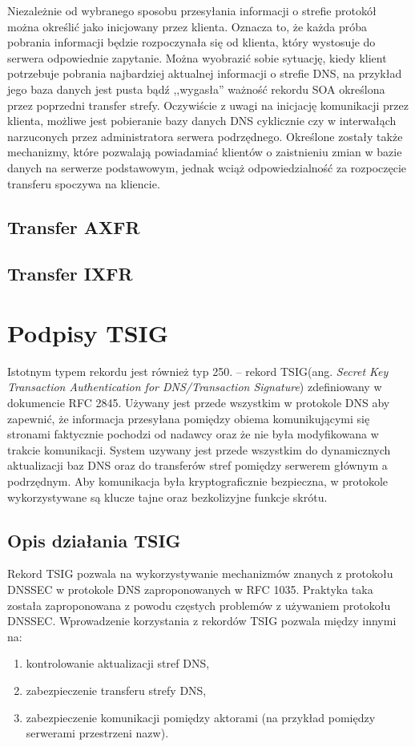 Niezależnie od wybranego sposobu przesyłania informacji o strefie protokół można określić jako inicjowany przez klienta. Oznacza to, że każda próba pobrania informacji będzie rozpoczynała się od klienta, który wystosuje do serwera odpowiednie zapytanie. Można wyobrazić sobie sytuację, kiedy klient potrzebuje pobrania najbardziej aktualnej informacji o strefie DNS, na przykład jego baza danych jest pusta bądź ,,wygasła'' ważność rekordu SOA określona przez poprzedni transfer strefy. Oczywiście z uwagi na inicjację komunikacji przez klienta, możliwe jest pobieranie bazy danych DNS cyklicznie czy w interwałąch narzuconych przez administratora serwera podrzędnego. Określone zostały także mechanizmy, które pozwalają powiadamiać klientów o zaistnieniu zmian w bazie danych na serwerze podstawowym\cite{RFC5936}, jednak wciąż odpowiedzialność za rozpoczęcie transferu spoczywa na kliencie.

\subsection{Transfer AXFR}


\subsection{Transfer IXFR}

\section{Podpisy TSIG}\label{TSIG}
Istotnym typem rekordu jest również typ 250. -- rekord TSIG(ang. \textit{Secret Key Transaction Authentication for DNS/Transaction Signature}) zdefiniowany w dokumencie RFC 2845\cite{RFC2845}. Używany jest przede wszystkim w protokole DNS aby zapewnić, że informacja przesyłana pomiędzy obiema komunikującymi się stronami faktycznie pochodzi od nadawcy oraz że nie była modyfikowana w trakcie komunikacji. System uzywany jest przede wszystkim do dynamicznych aktualizacji baz DNS oraz do transferów stref pomiędzy serwerem głównym a podrzędnym. Aby komunikacja była kryptograficznie bezpieczna, w protokole wykorzystywane są klucze tajne oraz bezkolizyjne funkcje skrótu.

\subsection{Opis działania TSIG}
Rekord TSIG pozwala na wykorzystywanie mechanizmów znanych z protokołu DNSSEC\cite{nask-tsig} w protokole DNS zaproponowanych w RFC 1035\cite{RFC1035}. Praktyka taka została zaproponowana z powodu częstych problemów z używaniem protokołu DNSSEC\cite{RFC4033, RFC4035}. Wprowadzenie korzystania z rekordów TSIG pozwala między innymi na:
\begin{enumerate}
	\item kontrolowanie aktualizacji stref DNS,
	\item zabezpieczenie transferu strefy DNS,
	\item zabezpieczenie komunikacji pomiędzy aktorami (na przykład pomiędzy serwerami przestrzeni nazw).
\end{enumerate}

